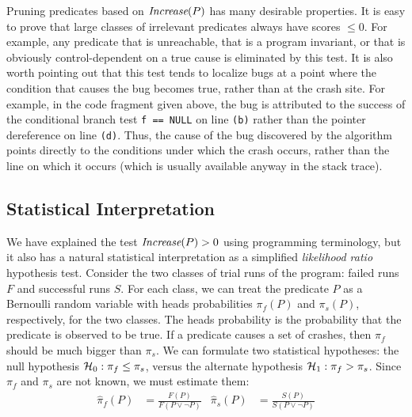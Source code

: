 Pruning predicates based on $\textit{Increase}(P)$ has many desirable
properties.  It is easy to prove that large classes of irrelevant
predicates always have scores $\leq 0$.  For example, any predicate
that is unreachable, that is a program invariant, or that is obviously
control-dependent on a true cause is eliminated by this test.  It is
also worth pointing out that this test tends to localize bugs at
a point where the condition that causes the bug becomes true, rather than at
the crash site.  For example, in the code fragment given above, the bug is
attributed to the success of the conditional branch test {\tt f ==
NULL} on line {\tt (b)} rather than the pointer dereference on line
{\tt (d)}.  Thus, the cause of the bug discovered by the algorithm
points directly to the conditions under which the crash occurs, rather than
the line on which it occurs (which is usually available anyway in the
stack trace).

\subsection{Statistical Interpretation}
\label{sec:statisticalinterpretation}

We have explained the test $\textit{Increase}(P) > 0$ using programming terminology,
but it also has a natural statistical interpretation as a simplified {\em likelihood ratio} hypothesis
test.  Consider the two classes of trial runs
of the program: failed runs $F$ and successful runs $S$.  For each
class, we can treat the predicate $P$ as a Bernoulli random variable
with heads probabilities $\pi_f(P)$ and $\pi_s(P)$, respectively, for the
two classes.  The heads
probability is the probability that the predicate is observed to be
true.  If a predicate causes a set of crashes, then $\pi_f$ should be
much bigger than $\pi_s$.  We can formulate two statistical hypotheses:
the null hypothesis ${\mathcal{H}}_0:
\pi_f \leq \pi_s$, versus the alternate hypothesis ${\mathcal{H}}_1: \pi_f > \pi_s$.  Since
$\pi_f$ and $\pi_s$ are not known, we must estimate them:
\begin{align*}
  \hat \pi_f(P) &= \frac{F(P)}{F(P \lor \lnot P)} &
  \hat \pi_s(P) &= \frac{S(P)}{S(P \lor \lnot P)}
\end{align*}

